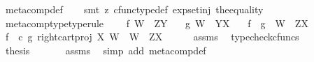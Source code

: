 \begin{isabellebody}
\ meta{\isacharunderscore}{\kern0pt}comp{}{\isacharunderscore}{\kern0pt}def\isanewline
\ \ \isamarkupfalse%
\ {\isacharparenleft}{\kern0pt}smt\ {\isacharparenleft}{\kern0pt}z{}{\isacharparenright}{\kern0pt}\ cfunc{\isacharunderscore}{\kern0pt}type{\isacharunderscore}{\kern0pt}def\ exp{\isacharunderscore}{\kern0pt}set{\isacharunderscore}{\kern0pt}inj\ the{\isacharunderscore}{\kern0pt}equality{\isacharparenright}{\kern0pt}%
\endisatagproof
{\isafoldproof}%
%
\isadelimproof
\isanewline
%
\endisadelimproof
\isanewline
{}\isamarkupfalse%
\ meta{\isacharunderscore}{\kern0pt}comp{}{\isacharunderscore}{\kern0pt}type{\isacharbrackleft}{\kern0pt}type{\isacharunderscore}{\kern0pt}rule{\isacharbrackright}{\kern0pt}{\isacharcolon}{\kern0pt}\ \isanewline
\ \ \ {\isachardoublequoteopen}f{\isacharcolon}{\kern0pt}\ W\ {\isasymrightarrow}\ Z\isactrlbsup Y\isactrlesup {\isachardoublequoteclose}\isanewline
\ \ \ {\isachardoublequoteopen}g{\isacharcolon}{\kern0pt}\ W\ {\isasymrightarrow}\ Y\isactrlbsup X\isactrlesup {\isachardoublequoteclose}\isanewline
\ \ \ {\isachardoublequoteopen}f\ {\isasymbox}\ g\ {\isacharcolon}{\kern0pt}\ W\ {\isasymrightarrow}\ Z\isactrlbsup X\isactrlesup {\isachardoublequoteclose}\isanewline
%
\isadelimproof
%
\endisadelimproof
%
\isatagproof
{}\isamarkupfalse%
\ {\isacharminus}{\kern0pt}\ \isanewline
\ \ \isamarkupfalse%
\ {\isachardoublequoteopen}{\isacharparenleft}{\kern0pt}f\isactrlsup {\isasymflat}\ \ {\isasymcirc}\isactrlsub c\ {\isasymlangle}g\isactrlsup {\isasymflat}{\isacharcomma}{\kern0pt}\ right{\isacharunderscore}{\kern0pt}cart{\isacharunderscore}{\kern0pt}proj\ X\ W{\isasymrangle}{\isacharparenright}{\kern0pt}\isactrlsup {\isasymsharp}\ {\isacharcolon}{\kern0pt}\ W\ {\isasymrightarrow}\ Z\isactrlbsup X\isactrlesup {\isachardoublequoteclose}\isanewline
\ \ \ \ \isamarkupfalse%
\ assms\ \isamarkupfalse%
\ typecheck{\isacharunderscore}{\kern0pt}cfuncs\isanewline
\ \ \isamarkupfalse%
\ \isamarkupfalse%
\ {\isacharquery}{\kern0pt}thesis\ \isanewline
\ \ \ \ \isamarkupfalse%
\ assms\ \isamarkupfalse%
\ {\isacharparenleft}{\kern0pt}simp\ add{\isacharcolon}{\kern0pt}\ meta{\isacharunderscore}{\kern0pt}comp{}{\isacharunderscore}{\kern0pt}def{}{\isacharparenright}{\kern0pt}\isanewline
{}\isamarkupfalse%
%
\endisatagproof
{\isafoldproof}%
%
\isadelimproof

\end{isabellebody}
